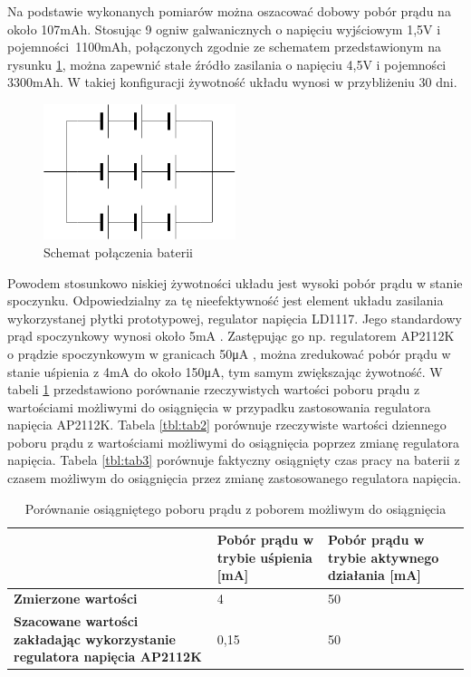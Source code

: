         Na podstawie wykonanych pomiarów można oszacować dobowy pobór prądu na około 107mAh. Stosując 9 ogniw galwanicznych o napięciu wyjściowym 1,5V i pojemności~1100mAh, połączonych zgodnie ze schematem przedstawionym na rysunku \ref{fig:battery_layout}, można zapewnić stałe źródło zasilania o napięciu 4,5V i pojemności 3300mAh. W takiej konfiguracji żywotność układu wynosi w przybliżeniu 30 dni.

        \begin{figure}[]
            \centering
            \includegraphics[width=0.5\textwidth]{chapters/images/battery_layout.png}
            \caption{Schemat połączenia baterii}
            \label{fig:battery_layout}
        \end{figure}

        Powodem stosunkowo niskiej żywotności układu jest wysoki pobór prądu w stanie spoczynku. Odpowiedzialny za tę nieefektywność jest element układu zasilania wykorzystanej płytki prototypowej, regulator napięcia LD1117. Jego standardowy prąd spoczynkowy wynosi około 5mA \cite{AMS1117-ds}. Zastępując go np. regulatorem AP2112K o prądzie spoczynkowym w granicach 50μA \cite{AP2112K-ds}, można zredukować pobór prądu w stanie uśpienia z 4mA do około 150μA, tym samym zwiększając żywotność. W tabeli \ref{tbl:tab1} przedstawiono porównanie rzeczywistych wartości poboru prądu z wartościami możliwymi do osiągnięcia w przypadku zastosowania regulatora napięcia AP2112K. Tabela \ref{tbl:tab2} porównuje rzeczywiste wartości dziennego poboru prądu z wartościami możliwymi do osiągnięcia poprzez zmianę regulatora napięcia. Tabela \ref{tbl:tab3} porównuje faktyczny osiągnięty czas pracy na baterii z czasem możliwym do osiągnięcia przez zmianę zastosowanego regulatora napięcia.


        \begin{table}[]
            \caption{Porównanie osiągniętego poboru prądu z poborem możliwym do osiągnięcia}
            \centering
            \begin{tabular}{p{6cm}|p{4cm}|p{4cm} }
                    & \textbf{Pobór prądu w trybie uśpienia [mA]} & \textbf{Pobór prądu w trybie aktywnego działania [mA]} \\ \hline
             \textbf{Zmierzone wartości}
                      & 4 & 50 \\
            \hline
            \textbf{Szacowane wartości zakładając wykorzystanie regulatora napięcia AP2112K} &  0,15 & 50  \\
            \end{tabular}
            \label{tbl:tab1}
            \vspace{10mm}
        \end{table}

